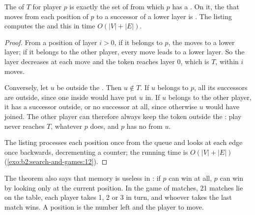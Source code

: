 \label{lst:b2:search-and-games:attractor}

\begin{theorem}[Attractor]\label{thm:b2:search-and-games:attractor}
The  of $T$ for player $p$ is exactly the set of  from which $p$ has a . On it, the
 that moves from each position of $p$ to a successor of a lower layer is . The listing computes
the  and this  in time $O(|V| + |E|)$.
\end{theorem}

\begin{proof}
From a position of layer $i > 0$, if it belongs to $p$, the  moves to a lower layer; if it belongs to the other
player, every move leads to a lower layer. So the layer decreases at each move and the token reaches layer $0$, which is
$T$, within $i$ moves.

Conversely, let $u$ be outside the . Then $u \notin T$. If $u$ belongs to $p$, all its successors are outside,
since one inside would have put $u$ in. If $u$ belongs to the other player, it has a successor outside, or no successor at
all, since otherwise $u$ would have joined. The other player can therefore always keep the token outside the :
play never reaches $T$, whatever $p$ does, and $p$ has no  from $u$.

The listing processes each position once from the queue and looks at each edge once backwards, decrementing a counter;
the running time is $O(|V| + |E|)$ (\cref{exo:b2:search-and-games:12}).
\end{proof}

The theorem also says that memory is useless in : if $p$ can win at all, $p$ can win by looking only at
the current position. In the game of matches, 21 matches lie on the table, each player takes 1, 2 or 3 in turn, and
whoever takes the last match wins. A position is the number left and the player to move.


